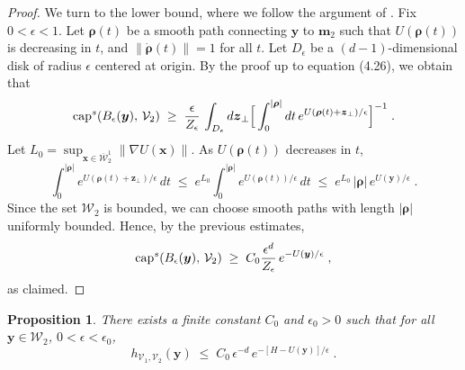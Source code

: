 \documentclass[reqno]{amsart}
\newtheorem{proposition}[theorem]{Proposition}
\newcounter{as}[section]
\newcommand{\mc}[1]{{\mathcal #1}}
\newcommand{\bs}[1]{{\boldsymbol #1}}
\newcommand{\<}{\langle}
\renewcommand{\>}{\rangle}
\begin{document}
\begin{proof}
We turn to the lower bound, where we follow the argument of
\cite[Proposition 4.7] {BEGK1}. Fix $0<\epsilon<1$. Let $\bs \rho(t)$ be
a smooth path connecting $\boldsymbol{y}$ to $\boldsymbol{m}_{2}$ such
that $U(\bs \rho(t))$ is decreasing in $t$, and $\|\dot{\bs \rho}(t)\|=1$
for all $t$. Let $D_{\epsilon}$ be a $(d-1)$-dimensional disk of
radius $\epsilon$ centered at origin. By the proof \cite[Proposition
4.7] {BEGK1} up to equation (4.26), we obtain that
\begin{equation*}
\textup{cap}^{s}(B_{\epsilon}(\boldsymbol{y}),\,\mathcal{V}_{2})
\;\ge\; \frac{\epsilon}{Z_{\epsilon}}\,
\int_{D_{\epsilon}} d\boldsymbol{z}_{\perp}
\Big[\int_{0}^{|\bs \rho|}dt \,
e^{U(\bs \rho(t)+\boldsymbol{z}_{\perp})/\epsilon}\Big]^{-1}\; .
\end{equation*}
Let $L_{0}=\sup_{\boldsymbol{x}\in\overline{\mathcal{W}}_{2}^{1}} \|\nabla
U(\boldsymbol{x})\|$. As $U(\bs \rho(t))$ decreases in $t$,
\begin{equation*}
\int_{0}^{|\bs \rho|} e^{U(\bs \rho(t)+\boldsymbol{z}_{\perp})/\epsilon}
\, dt
\;\le \; e^{L_{0}}\int_{0}^{|\bs \rho|} e^{U(\bs \rho(t))/\epsilon} \, dt
\;\le\; e^{L_{0}} \, |\bs \rho| \, e^{U(\boldsymbol{y})/\epsilon}\;.
\end{equation*}
Since the set $\mc W_2$ is bounded, we can choose smooth paths with
length $|\bs \rho|$ uniformly bounded. Hence, by the previous estimates,
\begin{equation*}
\textup{cap}^{s}(B_{\epsilon}(\boldsymbol{y}),\,\mathcal{V}_{2})
\;\ge\; C_0 \frac{\epsilon^{d}}{Z_{\epsilon}}\,
e^{-U(\boldsymbol{y})/\epsilon}\; ,
\end{equation*}
as claimed.
\end{proof}

\begin{proposition}
\label{7-l11}
There exists a finite constant $C_0$ and $\epsilon_0>0$ such that for
all $\bs y\in \mc W_2$, $0<\epsilon<\epsilon_0$,
\begin{equation}
\label{7-6}
h_{\mc V_1, \mc V_2}(\bs y) \;\le\; C_0\,
\epsilon^{-d}\, e^{- [H - U(\bs y)] /\epsilon}\;.
\end{equation}

\end{proposition}

\end{document}

